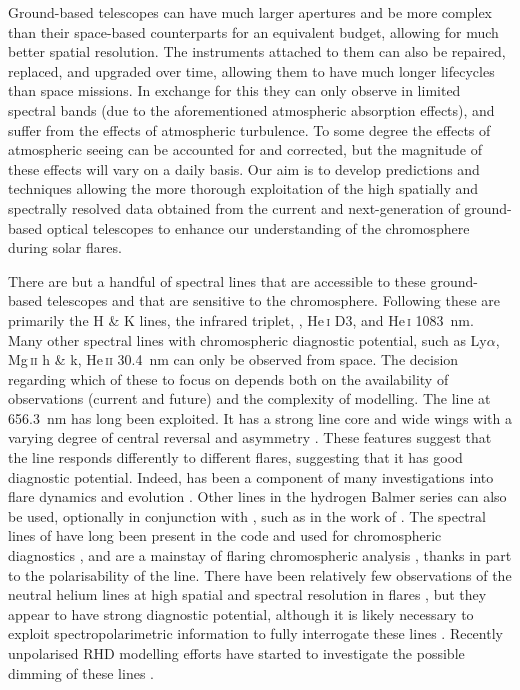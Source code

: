 Ground-based telescopes can have much larger apertures and be more complex than their space-based counterparts for an equivalent budget, allowing for much better spatial resolution.
The instruments attached to them can also be repaired, replaced, and upgraded over time, allowing them to have much longer lifecycles than space missions.
In exchange for this they can only observe in limited spectral bands (due to the aforementioned atmospheric absorption effects), and suffer from the effects of atmospheric turbulence.
To some degree the effects of atmospheric seeing can be accounted for and corrected, but the magnitude of these effects will vary on a daily basis.
Our aim is to develop predictions and techniques allowing the more thorough exploitation of the high spatially and spectrally resolved data obtained from the current and next-generation of ground-based optical telescopes to enhance our understanding of the chromosphere during solar flares.

There are but a handful of spectral lines that are accessible to these ground-based telescopes and that are sensitive to the chromosphere.
Following \citet{DelaCruzRodriguez2017} these are primarily the \Caii{} H \& K lines, the \Caii{} infrared triplet, \Ha{}, He\,\textsc{i} D3, and He\,\textsc{i} \SI{1083}{\nano\metre}.
Many other spectral lines with chromospheric diagnostic potential, such as Ly$\alpha$, Mg\,\textsc{ii} h \& k, He\,\textsc{ii} \SI{30.4}{\nano\metre} can only be observed from space.
The decision regarding which of these to focus on depends both on the availability of observations (current and future) and the complexity of modelling.
The \Ha{} line at \SI{656.3}{\nano\m} has long been exploited.
It has a strong line core and wide wings with a varying degree of central reversal and asymmetry \citep[e.g. ][]{Svestka1966}.
These features suggest that the line responds differently to different flares, suggesting that it has good diagnostic potential.
Indeed, \Ha{} has been a component of many investigations into flare dynamics and evolution \citep[e.g.][]{Acton1982,Heinzel1994,Wang1995,Kuridze2015,RubioDaCosta2016}.
Other lines in the hydrogen Balmer series can also be used, optionally in conjunction with \Ha{}, such as in the work of \citet{Capparelli2017}.
The spectral lines of \Caii{} have long been present in the \Radyn{} code and used for chromospheric diagnostics \citep[e.g.][]{Carlsson1992a}, and are a mainstay of flaring chromospheric analysis \citep[e.g.][]{1997Mein,Cauzzi2008,Kuridze2015,RubioDaCosta2016,Kuridze2018,Vissers2021,Yadav2021}, thanks in part to the polarisability of the \CaLine{} line.
There have been relatively few observations of the neutral helium lines at high spatial and spectral resolution in flares \citep[e.g.][]{Zeng2014, Libbrecht2019}, but they appear to have strong diagnostic potential, although it is likely necessary to exploit spectropolarimetric information to fully interrogate these lines \citep{Libbrecht2019}.
Recently unpolarised RHD modelling efforts have started to investigate the possible dimming of these lines \citep{Kerr2021}.

